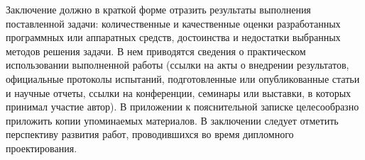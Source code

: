 Заключение должно в краткой форме отразить результаты выполнения поставленной задачи:
	количественные и качественные оценки разработанных программных или аппаратных средств,
	достоинства и недостатки выбранных методов решения задачи. В нем приводятся сведения о
	практическом использовании выполненной работы (ссылки на акты о внедрении результатов,
	официальные протоколы испытаний, подготовленные или опубликованные статьи и научные отчеты,
	ссылки на конференции, семинары или выставки, в которых принимал участие автор). В приложении
	к пояснительной записке целесообразно приложить копии упоминаемых материалов. В заключении
	следует отметить перспективу развития работ, проводившихся во время дипломного проектирования.